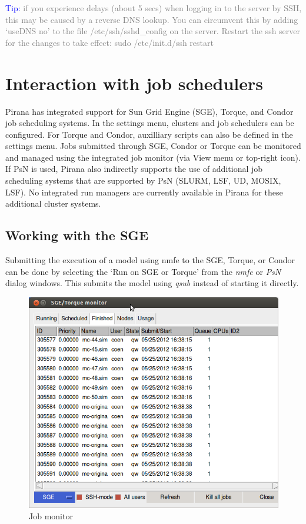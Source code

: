 {{{{\vspace{10pt}
\noindent\scriptsize \textcolor{Blue}{Tip:} \textcolor{Grey} {if you experience delays (about 5 secs) when logging in to the
    server by SSH, this may be caused by a reverse DNS lookup. You can
    circumvent this by adding `useDNS no' to the file
    /etc/ssh/sshd\_config on the server. Restart the ssh server for
    the changes to take effect: sudo /etc/init.d/ssh restart}
  \normalsize

\section{Interaction with job schedulers}
Pirana has integrated support for Sun Grid Engine (SGE), Torque, and
Condor job scheduling systems.  In the settings menu, clusters and job
schedulers can be configured.  For Torque and Condor, auxilliary
scripts can also be defined in the settings menu.  Jobs submitted
through SGE, Condor or Torque can be monitored and managed using the
integrated job monitor (via View menu or top-right
icon).  If PsN is used, Pirana also indirectly supports the use of
additional job scheduling systems that are supported by PsN (SLURM,
LSF, UD, MOSIX, LSF).  No integrated run managers are currently
available in Pirana for these additional cluster systems.

\subsection{Working with the SGE}
Submitting the execution of a model using nmfe to the SGE, Torque, or Condor can be done
by selecting the `Run on SGE or Torque' from the \textit{nmfe} or \textit{PsN} dialog windows.
This submits the model using \textit{qsub} instead of starting it directly.

\begin{figure}[hbt] \centering
    \includegraphics[scale=0.3]{images/Figure3_1_SGEmonitor.png}
    \caption{Job monitor}
\end{figure}

}}}}
